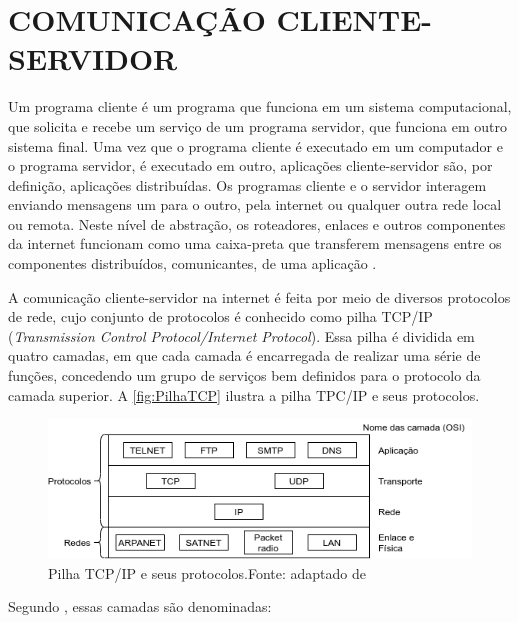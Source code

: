 \section {COMUNICAÇÃO CLIENTE-SERVIDOR}

Um programa cliente é um programa que funciona em um sistema computacional, que solicita e recebe um serviço de um programa servidor, que funciona em outro sistema final. Uma vez que o programa cliente é executado em um computador e o programa servidor, é executado em outro, aplicações cliente-servidor são, por definição, aplicações distribuídas. Os programas cliente e o servidor interagem enviando mensagens um para o outro, pela internet ou qualquer outra rede local ou remota. Neste nível de abstração, os roteadores, enlaces e outros componentes da internet funcionam como uma caixa-preta que transferem mensagens entre os componentes distribuídos, comunicantes, de uma aplicação \cite{Kurose2010}.

A comunicação cliente-servidor na internet é feita por meio de diversos protocolos de rede, cujo conjunto de protocolos é conhecido como pilha TCP/IP (\textit{Transmission Control Protocol/Internet Protocol}). Essa pilha é dividida em quatro camadas, em que cada camada é encarregada de realizar uma série de funções, concedendo um grupo de serviços bem definidos para o protocolo da camada superior. A \autoref{fig:PilhaTCP} ilustra a pilha TPC/IP e seus protocolos. 

\begin{figure}[H]
    \scriptsize
     \centering
     \includegraphics[scale=0.8]{dados/figuras/PilhaTCP-IP.png}
     \caption{Pilha TCP/IP e seus protocolos.\newline Fonte: adaptado de \cite{tanenbaumRedes}}
     \label{fig:PilhaTCP}
\end{figure}

Segundo , essas camadas são denominadas:

